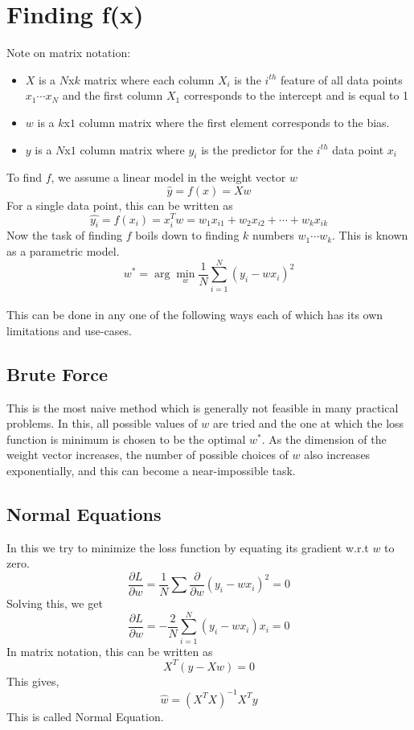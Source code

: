 \section{Finding f(x)}
Note on matrix notation: 
\begin{itemize}
\item $X$ is a $N$x$k$ matrix where each column $X_{i}$ is the $i^{th}$ feature of all data points $x_{1} \cdots x_{N}$ and the first column $X_{1}$ corresponds to the intercept and is equal to 1
\item $w$ is a $k$x$1$ column matrix where the first element corresponds to the bias. 
\item $y$ is a $N$x$1$ column matrix where $y_{i}$ is the predictor for the $i^{th}$ data point $x_{i}$
\end{itemize}
To find $f$, we assume a linear model in the weight vector $w$
\begin{equation}
\hat{y}=f(x)=Xw
\end{equation}
For a single data point, this can be written as
\begin{equation}
\hat{y_{i}}=f(x_{i})=x_{i}^{T}w=w_{1}x_{i1}+w_{2}x_{i2}+ \cdots +w_{k}x_{ik}
\end{equation}
Now the task of finding $f$ boils down to finding $k$ numbers $w_{1} \cdots w_{k}$. This is known as a parametric model. 
\begin{equation}
w^{*}=\arg\min_{w}\frac{1}{N}\sum_{i=1}^{N}{(y_{i}-wx_{i})^{2}}
\end{equation}
\\This can be done in any one of the following ways each of which has its own limitations and use-cases. 
\subsection{Brute Force}
This is the most naive method which is generally not feasible in many practical problems. In this, all possible values of $w$ are tried and the one at which the loss function is minimum is chosen to be the optimal $w^{*}$. As the dimension of the weight vector increases, the number of possible choices of $w$ also increases exponentially, and this can become a near-impossible task. 
\subsection{Normal Equations}
In this we try to minimize the loss function by equating its gradient w.r.t $w$ to zero. 
\begin{equation}
\frac{\partial L}{\partial w}=\frac{1}{N}\sum{\frac{\partial}{\partial w} (y_{i}-wx_{i})^{2}}=0
\end{equation}
Solving this, we get
\begin{equation}
\frac{\partial L}{\partial w}=-\frac{2}{N}\sum_{i=1}^{N}{(y_{i}-wx_{i})x_{i}}=0
\end{equation}
In matrix notation, this can be written as
\begin{equation}
X^{T}(y-Xw)=0
\end{equation}
This gives, 
\begin{equation}
\hat{w}=(X^{T}X)^{-1}X^{T}y
\end{equation}
This is called Normal Equation.

